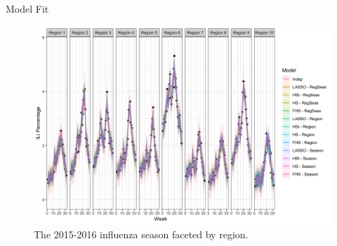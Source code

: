 \documentclass[final]{beamer}
\newlength{\onecolwid}
\newlength{\twocolwid}
\begin{document}
\begin{frame}[t]
\begin{columns}[t]
\begin{column}{\twocolwid}
\begin{block}{Model Fit}
\begin{figure}
\includegraphics[width=\linewidth]{plots/ILIfit.png}
\caption{The 2015-2016 influenza season faceted by region.}
\end{figure}
\end{block}


\begin{columns}[t,totalwidth=\twocolwid] %

\begin{column}{\onecolwid} %


% 
% 


\end{column} %

\begin{column}{\onecolwid} %


\end{column}
\end{columns}
\end{column}
\end{columns}
\end{frame}
\end{document}
